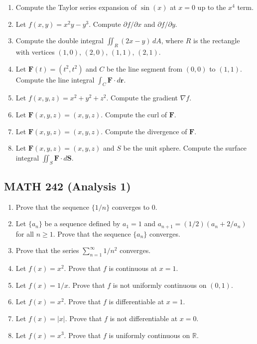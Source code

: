 \documentclass{article}
\begin{document}
\begin{enumerate}
\item Compute the Taylor series expansion of $\sin(x)$ at $x = 0$ up to the $x^4$ term.
\item Let $f(x, y) = x^2y - y^3$. Compute $\partial f/\partial x$ and $\partial f/\partial y$.
\item Compute the double integral $\iint_R (2x - y) \, dA$, where $R$ is the rectangle with vertices $(1, 0)$, $(2, 0)$, $(1, 1)$, $(2, 1)$.
\item Let $\mathbf{F}(t) = (t^2, t^2)$ and $C$ be the line segment from $(0, 0)$ to $(1, 1)$. Compute the line integral $\int_C \mathbf{F} \cdot d\mathbf{r}$.
\item Let $f(x, y, z) = x^2 + y^2 + z^2$. Compute the gradient $\nabla f$.
\item Let $\mathbf{F}(x, y, z) = (x, y, z)$. Compute the curl of $\mathbf{F}$.
\item Let $\mathbf{F}(x, y, z) = (x, y, z)$. Compute the divergence of $\mathbf{F}$.
\item Let $\mathbf{F}(x, y, z) = (x, y, z)$ and $S$ be the unit sphere. Compute the surface integral $\iint_S \mathbf{F} \cdot d\mathbf{S}$.
\end{enumerate}

\subsection*{MATH 242 (Analysis 1)}

\begin{enumerate}
\item Prove that the sequence $\{1/n\}$ converges to 0.
\item Let $\{a_n\}$ be a sequence defined by $a_1 = 1$ and $a_{n+1} = (1/2)(a_n + 2/a_n)$ for all $n \geq 1$. Prove that the sequence $\{a_n\}$ converges.
\item Prove that the series $\sum_{n=1}^\infty 1/n^2$ converges.
\item Let $f(x) = x^2$. Prove that $f$ is continuous at $x = 1$.
\item Let $f(x) = 1/x$. Prove that $f$ is not uniformly continuous on $(0, 1)$.
\item Let $f(x) = x^2$. Prove that $f$ is differentiable at $x = 1$.
\item Let $f(x) = |x|$. Prove that $f$ is not differentiable at $x = 0$.
\item Let $f(x) = x^3$. Prove that $f$ is uniformly continuous on $\mathbb{R}$.
\end{enumerate}
\end{document}
